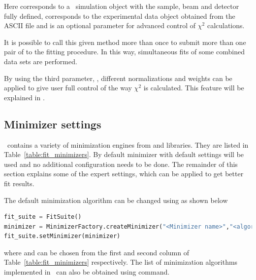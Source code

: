 Here  corresponds to a \BornAgain\ simulation object
with the  sample, beam and detector fully defined, 
corresponds to the experimental data object obtained from the ASCII file and  is an optional parameter for advanced 
control of $\chi^2$ calculations.

It is possible to call this given method more than once to submit more than one pair of
 to the fitting procedure.
In this way, simultaneous fits of
some combined data sets are performed.

By using the third parameter, , different normalizations and weights
can be applied to give user full control of the way $\chi^2$ is calculated.
This feature will be explained in .


\subsection{Minimizer settings}

\BornAgain\ contains a variety of minimization engines from  and 
libraries. They are listed in Table~\ref{table:fit_minimizers}.
By default  minimizer with default settings will be used and no additional
configuration needs to be done.
The remainder of this section explains some of the expert settings, which can be applied to get better 
fit results.

The default minimization algorithm can be changed using 
 as shown below
\begin{lstlisting}[language=python, style=eclipseboxed,numbers=none]
fit_suite = FitSuite()
minimizer = MinimizerFactory.createMinimizer("<Minimizer name>","<algorithm>")
fit_suite.setMinimizer(minimizer)
\end{lstlisting}

where  and  can be chosen from the first and
second column of Table~\ref{table:fit_minimizers} respectively. 
The list of minimization algorithms implemented in \BornAgain\
can also be obtained using  command.


